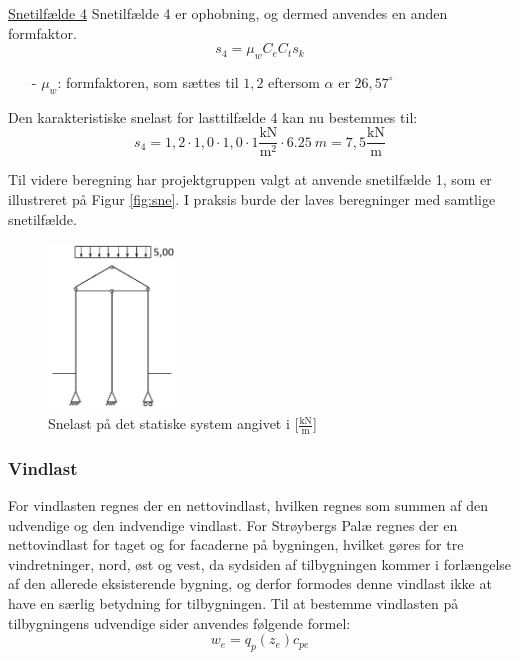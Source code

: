 \underline{Snetilfælde 4}
\newline
Snetilfælde 4 er ophobning, og dermed anvendes en anden formfaktor.
\begin{equation}
	s_4 = \mu_w C_e C_t s_k
\end{equation}

\begin{itemize}
	\item[-] $\mu_w$: formfaktoren, som sættes til $1,\!2$ eftersom $\alpha$ er $26,\!57^{\circ}$ \citep[ kapitel 5.3.3]{EU91}
\end{itemize}

Den karakteristiske snelast for lasttilfælde 4 kan nu bestemmes til:
\begin{equation}
	s_4 = 1,\!2\cdot 1,\!0\cdot 1,\!0\cdot 1 \frac{\text{kN}}{\text{m}^2}\cdot \SI{6,25}{m} = 7,\!5 \frac{\text{kN}}{\text{m}}
\end{equation}

Til videre beregning har projektgruppen valgt at anvende snetilfælde 1, som er illustreret på Figur \ref{fig:sne}. I praksis burde der laves beregninger med samtlige snetilfælde.

\begin{figure}[H]
	\centering
	\includegraphics[width=0.3\textwidth]{billeder/snelast.png}
	\caption{Snelast på det statiske system angivet i [$\frac{\text{kN}}{\text{m}}$]}
	\label{fig:snelast}
\end{figure}

\subsubsection{Vindlast}
For vindlasten regnes der en nettovindlast, hvilken regnes som summen af den udvendige og den indvendige vindlast.
\newline \indent{     }  For Strøybergs Palæ regnes der en nettovindlast for taget og for facaderne på bygningen, hvilket gøres for tre vindretninger, nord, øst og vest, da sydsiden af tilbygningen kommer i forlængelse af den allerede eksisterende bygning, og derfor formodes denne vindlast ikke at have en særlig betydning for tilbygningen.
\newline
\newline
Til at bestemme vindlasten på tilbygningens udvendige sider anvendes følgende formel:	
\begin{equation} 
	w_e = q_p(z_e)c_{pe}
\end{equation}

